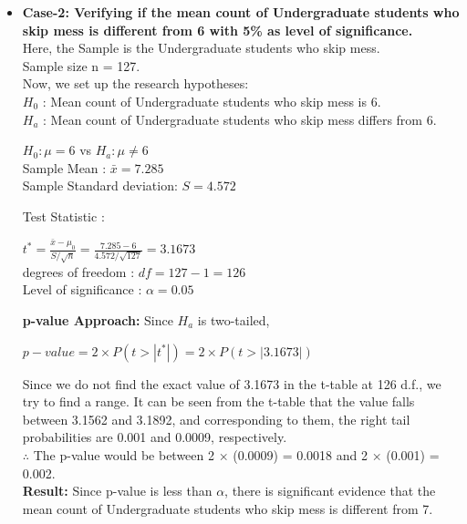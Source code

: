 \documentclass{article}
\begin{document}
\begin{itemize}
\item{\textbf{Case-2: Verifying if the mean count of Undergraduate students who skip mess is different from 6 with 5\% as level of significance.}}\\
Here, the Sample is the Undergraduate students who skip mess.\\
Sample size n = 127.\\
Now, we set up the research hypotheses:\\
$H_0$ : Mean count of Undergraduate students who skip mess is 6.\\
$H_a$ : Mean count of Undergraduate students who skip mess differs from 6.
\begin{center}
$H_0 : \mu = 6$ \quad vs \quad $H_a : \mu \neq 6$\\
Sample Mean : $\bar{x} = 7.285$\\
Sample Standard deviation: $S = 4.572$
\end{center}
Test Statistic :
\begin{center}
$t^* = \frac{\bar{x}-\mu_0}{S/\sqrt{n}} = \frac{7.285-6}{4.572/\sqrt{127}} = 3.1673$\\
degrees of freedom : $df = 127 - 1 = 126$ \\
Level of significance : $\alpha = 0.05$
\end{center}
\textbf{p-value Approach:}
Since $H_a$ is two-tailed,
\begin{center}
$p-value = 2\times P(t>|t^*|) = 2\times P(t>|3.1673|)$ 
\end{center}
Since we do not find the exact value of 3.1673 in the t-table at 126 d.f., we try to find a range. It can be seen from the t-table that the value falls between 3.1562 and 3.1892, and corresponding to them, the right tail probabilities are 0.001 and 0.0009, respectively.\\
$\therefore$ The p-value would be between 2 × (0.0009) = 0.0018 and 2 × (0.001) = 0.002.\\
\textbf{Result:}
Since p-value is less than $\alpha$, there is significant evidence that the mean count of Undergraduate students who skip mess is different from 7.\\


\end{itemize}
\end{document}
